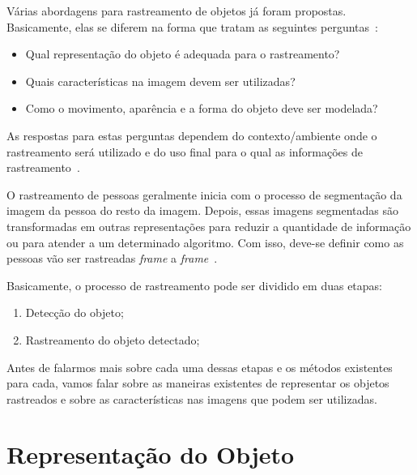 	Várias abordagens para rastreamento de objetos já foram propostas. Basicamente, elas se diferem na forma que tratam as seguintes perguntas~\cite{yilmaz}: 
		
		\begin{itemize}
			\item Qual representação do objeto é adequada para o rastreamento?
			\item Quais características na imagem devem ser utilizadas?
			\item Como o movimento, aparência e a forma do objeto deve ser modelada? 
		\end{itemize}

	As respostas para estas perguntas dependem do contexto/ambiente onde o rastreamento será utilizado e do uso final para o qual as informações de rastreamento~\cite{yilmaz}.

	O rastreamento de pessoas geralmente inicia com o processo de segmentação da imagem da pessoa do resto da imagem. Depois, essas imagens segmentadas são transformadas em outras representações para reduzir a quantidade de informação ou para atender a um determinado algoritmo. Com isso, deve-se definir como as pessoas vão ser rastreadas \textit{frame} a \textit{frame}~\cite{moeslund}.

	Basicamente, o processo de rastreamento pode ser dividido em duas etapas:

		\begin{enumerate}
			\item Detecção do objeto;
			\item Rastreamento do objeto detectado;
		\end{enumerate}

	Antes de falarmos mais sobre cada uma dessas etapas e os métodos existentes para cada, vamos falar sobre as maneiras existentes de representar os objetos rastreados e sobre as características nas imagens que podem ser utilizadas.


\section{Representação do Objeto}

